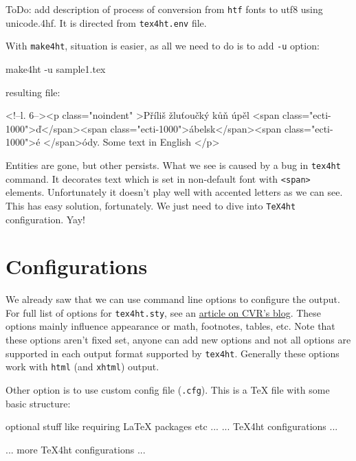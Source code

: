 ToDo: add description of process of conversion from \texttt{htf} fonts
to utf8 using unicode.4hf. It is directed from \texttt{tex4ht.env} file.

With \texttt{make4ht}, situation is easier, as all we need to do is to
add \texttt{-u} option:

\begin{shellcommand}
make4ht -u sample1.tex
\end{shellcommand}

resulting file:

\begin{htmlsource}
<!--l. 6--><p class="noindent" >Příliš žluťoučký kůň úpěl <span 
class="ecti-1000">ď</span><span 
class="ecti-1000">ábelsk</span><span 
class="ecti-1000">é </span>ódy. Some text in English
</p> 
\end{htmlsource}

Entities are gone, but other persists. What we see is caused by a bug in
\texttt{tex4ht} command. It decorates text which is set in non-default
font with \texttt{\textless{}span\textgreater{}} elements. Unfortunately
it doesn't play well with accented letters as we can see. This has easy
solution, fortunately. We just need to dive into \texttt{TeX4ht}
configuration. Yay!

\hypertarget{configurations}{%
\section{Configurations}\label{configurations}}

We already saw that we can use command line options to configure the
output. For full list of options for \texttt{tex4ht.sty}, see an
\href{http://www.cvr.cc/?p=504}{article on CVR's blog}. These options
mainly influence appearance or math, footnotes, tables, etc. Note that
these options aren't fixed set, anyone can add new options and not all
options are supported in each output format supported by
\texttt{tex4ht}. Generally these options work with \texttt{html} (and
\texttt{xhtml}) output.

Other option is to use custom config file (\texttt{.cfg}). This is a TeX
file with some basic structure:

\begin{texsource}
 optional stuff like requiring LaTeX packages etc
 ...
 ...
 TeX4ht configurations
 ...
  
 ...
 more TeX4ht configurations
 ...
 \EndPreamble
\end{texsource}

